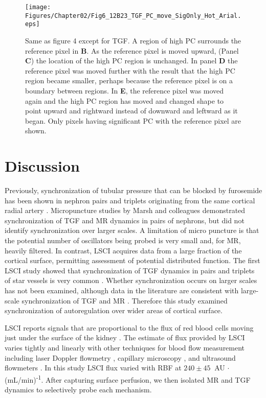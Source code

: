 \begin{figure}[H]
\begin{center}
\texttt{[image: Figures/Chapter02/Fig6\_12B23\_TGF\_PC\_move\_SigOnly\_Hot\_Arial.eps]}
\caption[Effect of reference pixel location on tubuloglomerular feedback phase coherence]{Same as figure 4 except for TGF. A region of high PC surrounds the reference pixel in \textbf{B}. As the reference pixel is moved upward, (Panel \textbf{C}) the location of the high PC region is unchanged. In panel \textbf{D} the reference pixel was moved further with the result that the high PC region became smaller, perhaps because the reference pixel is on a boundary between regions. In \textbf{E}, the reference pixel was moved again and the high PC region has moved and changed shape to point upward and rightward instead of downward and leftward as it began. Only pixels having significant PC with the reference pixel are shown.}
\end{center}
\end{figure}


\section{Discussion}

	Previously, synchronization of tubular pressure that can be blocked by furosemide has been shown in nephron pairs and triplets originating from the same cortical radial artery \cite{HolsteinRathlou87,Kallskog90,Yip92}. Micropuncture studies by Marsh and colleagues demonstrated synchronization of TGF \cite{HolsteinRathlou87,Yip92,Chen95} and MR \cite{Sosnovtseva09} dynamics in pairs of nephrons, but did not identify synchronization over larger scales. A limitation of micro puncture is that the potential number of oscillators being probed is very small and, for MR, heavily filtered. In contrast, LSCI acquires data from a large fraction of the cortical surface, permitting assessment of potential distributed function. The first LSCI study showed that synchronization of TGF dynamics in pairs and triplets of star vessels is very common \cite{HolsteinRathlou11}. Whether synchronization occurs on larger scales has not been examined, although data in the literature are consistent with large-scale synchronization of TGF \cite{HolsteinRathlou11} and MR \cite{Cupples96}. Therefore this study examined synchronization of autoregulation over wider areas of cortical surface.
	
	LSCI reports signals that are proportional to the flux of red blood cells moving just under the surface of the kidney \cite{Forrester04,Boas10}. The estimate of flux provided by LSCI varies tightly and linearly with other techniques for blood flow measurement including laser Doppler flowmetry \cite{Legrand11}, capillary microscopy \cite{Bezemer10}, and ultrasound flowmeters \cite{Scully13,HolsteinRathlou11}. In this study LSCI flux varied with RBF at $240 \pm 45 \ $ AU $\cdot$ (mL/min)\textsuperscript{-1}. After capturing surface perfusion, we then isolated MR and TGF dynamics to selectively probe each mechanism. 
	
